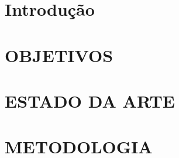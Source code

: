 \documentclass[
  a4paper,%
  12pt,%
  english,%
  brazilian,%
]{article}
\begin{document}





\section*{Introdução}%
\label{sect:intro}


\section*{OBJETIVOS} \label{sect:obj}



\section*{ESTADO DA ARTE} \label{sect:estadoarte}



\section*{METODOLOGIA} \label{sect:metodologia}








%

\end{document}
